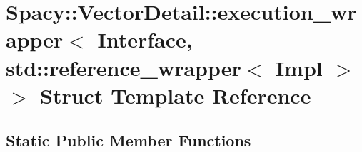 \hypertarget{structSpacy_1_1VectorDetail_1_1execution__wrapper_3_01Interface_00_01std_1_1reference__wrapper_3_01Impl_01_4_01_4}{\section{\-Spacy\-:\-:\-Vector\-Detail\-:\-:execution\-\_\-wrapper$<$ \-Interface, std\-:\-:reference\-\_\-wrapper$<$ \-Impl $>$ $>$ \-Struct \-Template \-Reference}
\label{structSpacy_1_1VectorDetail_1_1execution__wrapper_3_01Interface_00_01std_1_1reference__wrapper_3_01Impl_01_4_01_4}
}
\subsection*{\-Static \-Public \-Member \-Functions}
